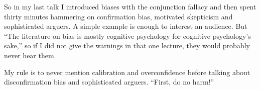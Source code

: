 So in my last talk I introduced biases with the conjunction fallacy and then spent thirty minutes hammering on confirmation bias, motivated skepticism and sophisticated arguers. A simple example is enough to interest an audience. But ``The literature on bias is mostly cognitive psychology for cognitive psychology's sake,'' so if I did not give the warnings in that one lecture, they would probably never hear them.

My rule is to never mention calibration and overconfidence before talking about disconfirmation bias and sophisticated arguers. ``First, do no harm!'' 
